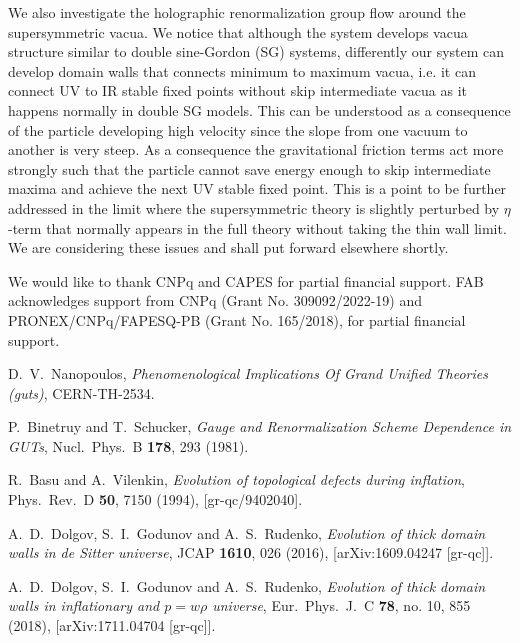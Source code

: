 \documentclass[aps,12pt, a4paper,nofootinbib]{revtex4}
\begin{document}
{We also investigate the holographic renormalization group flow around the supersymmetric vacua. We notice that although the system develops vacua structure similar to double sine-Gordon (SG) systems, differently our system can develop domain walls that connects minimum to maximum vacua, i.e. it can connect UV to IR stable fixed points without skip intermediate vacua as it happens normally in double SG models. This can be understood as a consequence of the particle developing high velocity since the slope from one vacuum to another is very steep. As a consequence the gravitational friction terms act more strongly such that the particle cannot save energy enough to skip intermediate maxima and achieve the next UV stable fixed point. This is a point to be further addressed in the limit where the supersymmetric theory is slightly perturbed by $\eta$-term that normally appears in the full theory without taking the thin wall limit. We are considering these issues and shall put forward elsewhere shortly.

\acknowledgments

We would like to thank CNPq and CAPES for partial financial support. FAB acknowledges support from CNPq (Grant No. 309092/2022-19) and PRONEX/CNPq/FAPESQ-PB (Grant No. 165/2018), for partial financial support.  
   
\begin{thebibliography}{99}

  D.~V.~Nanopoulos,
  {\it Phenomenological Implications Of Grand Unified Theories (guts)},
  CERN-TH-2534.
	
  P.~Binetruy and T.~Schucker,
  {\it Gauge and Renormalization Scheme Dependence in {GUTs}},
  Nucl.\ Phys.\ B {\bf 178}, 293 (1981).

  R.~Basu and A.~Vilenkin,
  {\it Evolution of topological defects during inflation},
  Phys.\ Rev.\ D {\bf 50}, 7150 (1994),
  [gr-qc/9402040].
	

  A.~D.~Dolgov, S.~I.~Godunov and A.~S.~Rudenko,
  {\it Evolution of thick domain walls in de Sitter universe},
  JCAP {\bf 1610}, 026 (2016),
  [arXiv:1609.04247 [gr-qc]].
	
  A.~D.~Dolgov, S.~I.~Godunov and A.~S.~Rudenko,
  {\it Evolution of thick domain walls in inflationary and $p=w\rho$ universe},
  Eur.\ Phys.\ J.\ C {\bf 78}, no. 10, 855 (2018),
  [arXiv:1711.04704 [gr-qc]].
  

\end{thebibliography}}
\end{document}
